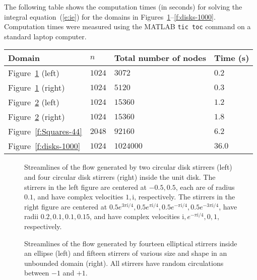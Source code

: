 \documentclass[11pt,a4paper]{article}
\renewcommand{\i}{\mathrm{i}}
\renewcommand{\i}{\mathrm{i}}
\begin{document}
 
The following table shows the computation times (in seconds) for solving the integral equation~(\ref{e:ie}) for the domains in Figures~\ref{f:disks}--\ref{f:disks-1000}. Computation times were measured using the MATLAB \verb|tic toc| command on a standard laptop computer.
\begin{center}
\begin{tabular}{llll}
\hline
Domain & $n$ & Total number of nodes & Time (s) \\
\hline
Figure~\ref{f:disks} (left)         & $1024$ & $3072$    & $0.2$ \\
Figure~\ref{f:disks} (right)        & $1024$ & $5120$    & $0.3$ \\
Figure~\ref{f:bou-unbou-15} (left)  & $1024$ & $15360$   & $1.2$ \\
Figure~\ref{f:bou-unbou-15} (right) & $1024$ & $15360$   & $1.8$ \\
Figure~\ref{f:Squares-44}           & $2048$ & $92160$   & $6.2$ \\
Figure~\ref{f:disks-1000}           & $1024$ & $1024000$ & $36.0$ \\
\hline
\end{tabular}
\end{center}

\begin{figure} %
\centerline{
\hfill
{}
}
\caption{Streamlines of the flow generated by two circular disk stirrers (left) and four circular disk stirrers (right) inside the unit disk. The stirrers in the left figure are centered at $-0.5,0.5$, each are of radius $0.1$, and have complex velocities $1,\i$, respectively. The stirrers in the right figure are centered at $0.5e^{3\pi\i/4},0.5e^{\pi\i/4},0.5e^{-\pi\i/4},0.5e^{-3\pi\i/4}$, have radii $0.2,0.1,0.1,0.15$, and have complex velocities $\i,e^{-\pi\i/4},0,1$, respectively.} 
\label{f:disks}
\end{figure}

\begin{figure} %
\centerline{
\hfill
{}
}
\caption{Streamlines of the flow generated by fourteen elliptical stirrers inside an ellipse (left) and fifteen stirrers of various size and shape in an unbounded domain (right). All stirrers have random circulations between $-1$ and $+1$.} 
\label{f:bou-unbou-15}
\end{figure}
\end{document}

